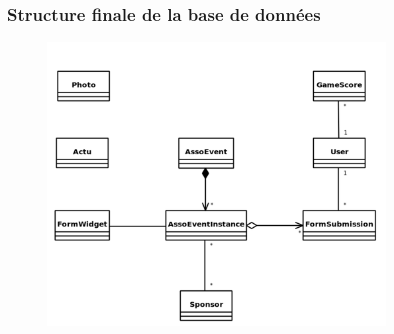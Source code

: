 \begin{frame}
    \frametitle{Structure finale de la base de données}
    \begin{figure}
        \centering
        \includegraphics[width=0.8\textwidth]{pictures/database.png}
    \end{figure}
\end{frame}
